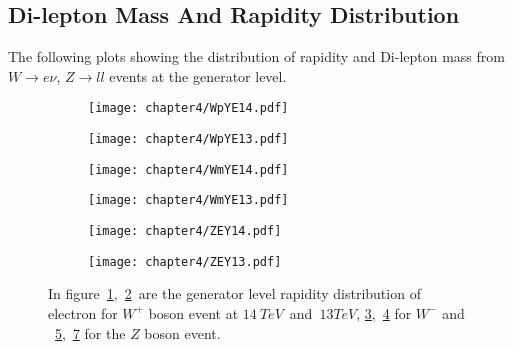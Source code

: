 \documentclass[a4paper,12pt]{report}
\numberwithin{equation}{section}
\begin{document}
\subsection{Di-lepton Mass And Rapidity Distribution}
The following plots showing the distribution of rapidity and Di-lepton mass from $W\rightarrow e\nu$, $Z\rightarrow ll$ events at the generator level.
\begin{figure}[H]
\centering
\begin{subfigure}{0.49\textwidth}
\texttt{[image: chapter4/WpYE14.pdf]}
\vspace*{-8mm}
\caption{}
\label{wpey14}
\end{subfigure}
\begin{subfigure}{0.49\textwidth}
\texttt{[image: chapter4/WpYE13.pdf]}
\vspace*{-8mm}
\caption{}
\label{wpey13}
\end{subfigure}
\begin{subfigure}{0.49\textwidth}
\texttt{[image: chapter4/WmYE14.pdf]}
\vspace*{-8mm}
\caption{}
\label{wmey14}
\end{subfigure}
\begin{subfigure}{0.49\textwidth}
\texttt{[image: chapter4/WmYE13.pdf]}
\vspace*{-8mm}
\caption{}
\label{wmey13}
\end{subfigure}
\begin{subfigure}{0.49\textwidth}
\texttt{[image: chapter4/ZEY14.pdf]}
\vspace*{-8mm}
\caption{}
\label{zey14}
\end{subfigure}
\begin{subfigure}{0.49\textwidth}
\texttt{[image: chapter4/ZEY13.pdf]}
\vspace*{-8mm}
\caption{}
\label{zey13}
\end{subfigure}
\caption{In figure~\ref{wpey14},~\ref{wpey13}~are the generator level rapidity distribution of electron for $W^{+}$ boson event at $14~TeV$~and~$13TeV$, \ref{wmey14},~\ref{wmey13} for $W^{-}$ and ~\ref{zey14},~\ref{zey13} for the $Z$ boson event.}  
\end{figure}
\end{document}
